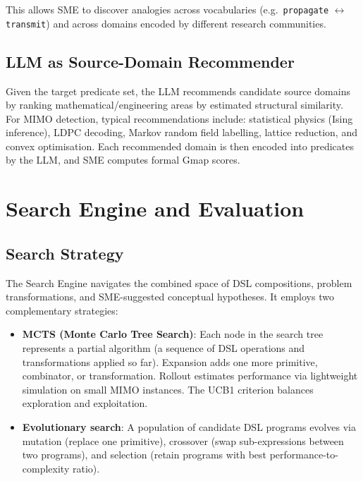 \documentclass[12pt,a4paper]{article}
\begin{document}
This allows SME to discover analogies across vocabularies (e.g.\
\texttt{propagate} $\leftrightarrow$ \texttt{transmit}) and across domains
encoded by different research communities.

\subsection{LLM as Source-Domain Recommender}

Given the target predicate set, the LLM recommends candidate source domains by
ranking mathematical/engineering areas by estimated structural similarity.  For
MIMO detection, typical recommendations include: statistical physics (Ising
inference), LDPC decoding, Markov random field labelling, lattice reduction,
and convex optimisation.  Each recommended domain is then encoded into
predicates by the LLM, and SME computes formal Gmap scores.

\section{Search Engine and Evaluation}
\label{sec:search}

\subsection{Search Strategy}

The Search Engine navigates the combined space of DSL compositions, problem
transformations, and SME-suggested conceptual hypotheses.  It employs two
complementary strategies:

\begin{itemize}[itemsep=2pt]
  \item \textbf{MCTS (Monte Carlo Tree Search)}: Each node in the search tree
        represents a partial algorithm (a sequence of DSL operations and
        transformations applied so far).  Expansion adds one more primitive,
        combinator, or transformation.  Rollout estimates performance via
        lightweight simulation on small MIMO instances.  The UCB1 criterion
        balances exploration and exploitation.
  \item \textbf{Evolutionary search}: A population of candidate DSL programs
        evolves via mutation (replace one primitive), crossover (swap
        sub-expressions between two programs), and selection (retain programs
        with best performance-to-complexity ratio).
\end{itemize}
\end{document}
